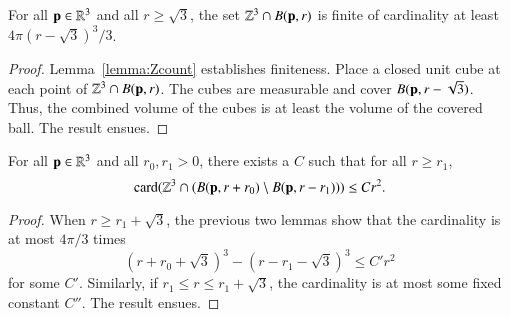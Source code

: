 \begin{lemma}[]
\label{lemma:Zlow-count}
For all ${\mathbf p}\in\mathbb{R}^3$ and all $r\ge\sqrt3$, the set
$\mathbb{Z}^3\cap B({\mathbf p},r)$ is finite of cardinality at least
$4\pi (r-\sqrt3)^3/3$.
\end{lemma}

\begin{proof} Lemma~\ref{lemma:Zcount} establishes finiteness.  Place
a closed unit cube at each point of $\mathbb{Z}^3\cap B({\mathbf p},r)$.  The
cubes are measurable and cover $B({\mathbf p},r-\sqrt3)$.  Thus, the combined
volume of the cubes is at least the volume of the covered ball.  The
result ensues.
\end{proof}

\begin{lemma}
\label{lemma:Zr2}
For all ${\mathbf p}\in\mathbb{R}^3$ and all $r_0,r_1>0$, there exists a $C$ such
that for all $r\ge r_1$, 
\[ 
{\operatorname{card}}(\mathbb{Z}^3 \cap (B({\mathbf p},r+r_0) \setminus B({\mathbf p},r-r_1))) \le C r^2.
\] 
\end{lemma}

\begin{proof}  When $r \ge r_1+\sqrt3$, the previous two lemmas show
that the cardinality is at most $4\pi/3$ times
\[ 
(r +r_0 + \sqrt3)^3 - (r - r_1 - \sqrt3)^3 \le C' r^2
\] 
for some $C'$.  Similarly, if $r_1\le r\le r_1+\sqrt3$, the
cardinality is at most some fixed constant $C''$.  The result
 ensues.
\end{proof}

